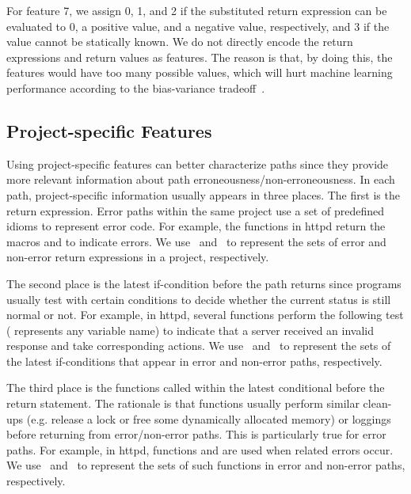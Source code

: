\documentclass[12pt]{report}	%
\begin{document}
For feature 7, we assign 0, 1, and 2 if the substituted return expression can be evaluated 
to 0, a positive value, and a negative value,
respectively, and 3 if the value cannot
be statically known. 
%
We do not directly encode the return expressions and return values as features.
The reason is that, by doing this, the features would have too many possible values, which will hurt 
machine learning performance according to the bias-variance tradeoff~\cite{geman1992neural}.

\subsection{Project-specific Features}
\label{sec:app:features:pp}

Using project-specific features can better characterize paths
since they provide more relevant information about path erroneousness/non-erroneousness.
In each path, project-specific information usually appears in 
three places. The first is the return expression. 
Error paths within the same project use a set of predefined idioms to represent error code.
%
For example, the functions in httpd
return the macros  and  to indicate errors. 
We use \errsetRetVar\ and \nerrsetRetVar\ to represent the sets of error and non-error
return expressions in a project, respectively.


The second place is the latest if-condition before the
path returns since programs usually test with certain conditions
to decide whether the current status is still normal or not. For example,
in httpd, several functions perform the following test
( represents any variable name)
to indicate that a server received an invalid response and 
take corresponding actions. 
We use \errsetLastCond\ and \nerrsetLastCond\ to represent the sets of the latest if-conditions
that appear in error and non-error paths, respectively.


The third place is the functions called within the latest conditional
before the return statement. 
The rationale is that functions 
usually perform similar clean-ups (e.g. release a lock or free some dynamically 
allocated memory) or loggings before returning from error/non-error paths. 
This is particularly true for error paths.
For example, in httpd, functions
 and
 are used when related errors occur. 
We use \errsetLastFunc\ and \nerrsetLastFunc\ to represent the sets of such functions
in error and non-error paths, respectively.
\end{document}
